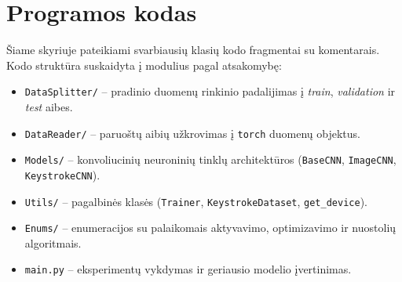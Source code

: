 \section{Programos kodas}
\label{sec:programos_kodas}

Šiame skyriuje pateikiami svarbiausių klasių kodo fragmentai su komentarais. Kodo struktūra suskaidyta į modulius pagal atsakomybę:
\begin{itemize}
    \item \texttt{DataSplitter/} – pradinio duomenų rinkinio padalijimas į \textit{train}, \textit{validation} ir \textit{test} aibes.
    \item \texttt{DataReader/} – paruoštų aibių užkrovimas į \texttt{torch} duomenų objektus.
    \item \texttt{Models/} – konvoliucinių neuroninių tinklų architektūros (\texttt{BaseCNN}, \texttt{ImageCNN}, \texttt{KeystrokeCNN}).
    \item \texttt{Utils/} – pagalbinės klasės (\texttt{Trainer}, \texttt{KeystrokeDataset}, \texttt{get\_device}).
    \item \texttt{Enums/} – enumeracijos su palaikomais aktyvavimo, optimizavimo ir nuostolių algoritmais.
    \item \texttt{main.py} – eksperimentų vykdymas ir geriausio modelio įvertinimas.
\end{itemize}






